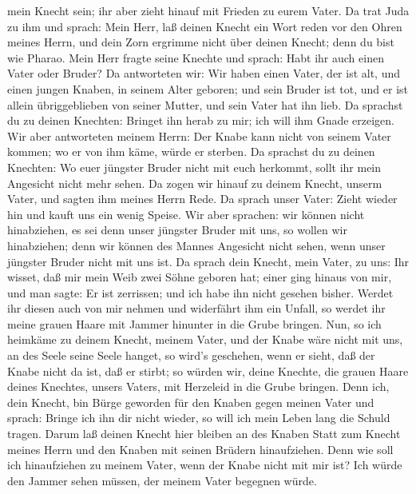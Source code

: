 mein Knecht sein; ihr aber zieht hinauf mit Frieden zu eurem Vater.
 Da trat Juda zu ihm und sprach: Mein Herr, laß deinen
Knecht ein Wort reden vor den Ohren meines Herrn, und dein Zorn ergrimme
nicht über deinen Knecht; denn du bist wie Pharao.  Mein
Herr fragte seine Knechte und sprach: Habt ihr auch einen Vater oder
Bruder?  Da antworteten wir: Wir haben einen Vater, der ist
alt, und einen jungen Knaben, in seinem Alter geboren; und sein Bruder
ist tot, und er ist allein übriggeblieben von seiner Mutter, und sein
Vater hat ihn lieb.  Da sprachst du zu deinen Knechten:
Bringet ihn herab zu mir; ich will ihm Gnade erzeigen.  Wir
aber antworteten meinem Herrn: Der Knabe kann nicht von seinem Vater
kommen; wo er von ihm käme, würde er sterben.  Da sprachst
du zu deinen Knechten: Wo euer jüngster Bruder nicht mit euch herkommt,
sollt ihr mein Angesicht nicht mehr sehen.  Da zogen wir
hinauf zu deinem Knecht, unserm Vater, und sagten ihm meines Herrn Rede.
 Da sprach unser Vater: Zieht wieder hin und kauft uns ein
wenig Speise.  Wir aber sprachen: wir können nicht
hinabziehen, es sei denn unser jüngster Bruder mit uns, so wollen wir
hinabziehen; denn wir können des Mannes Angesicht nicht sehen, wenn
unser jüngster Bruder nicht mit uns ist.  Da sprach dein
Knecht, mein Vater, zu uns: Ihr wisset, daß mir mein Weib zwei Söhne
geboren hat;  einer ging hinaus von mir, und man sagte: Er
ist zerrissen; und ich habe ihn nicht gesehen bisher. 
Werdet ihr diesen auch von mir nehmen und widerfährt ihm ein Unfall, so
werdet ihr meine grauen Haare mit Jammer hinunter in die Grube bringen.
 Nun, so ich heimkäme zu deinem Knecht, meinem Vater, und
der Knabe wäre nicht mit uns, an des Seele seine Seele hanget,
 so wird's geschehen, wenn er sieht, daß der Knabe nicht da
ist, daß er stirbt; so würden wir, deine Knechte, die grauen Haare
deines Knechtes, unsers Vaters, mit Herzeleid in die Grube bringen.
 Denn ich, dein Knecht, bin Bürge geworden für den Knaben
gegen meinen Vater und sprach: Bringe ich ihn dir nicht wieder, so will
ich mein Leben lang die Schuld tragen.  Darum laß deinen
Knecht hier bleiben an des Knaben Statt zum Knecht meines Herrn und den
Knaben mit seinen Brüdern hinaufziehen.  Denn wie soll ich
hinaufziehen zu meinem Vater, wenn der Knabe nicht mit mir ist? Ich
würde den Jammer sehen müssen, der meinem Vater begegnen würde.

